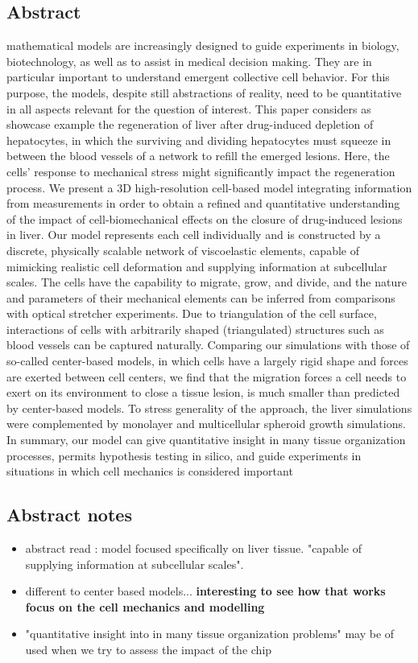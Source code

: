 \documentclass[11pt,a4paper]{article}
\begin{document}
\subsection*{Abstract}
mathematical models are increasingly designed to guide experiments in biology, biotechnology, as well as to assist in medical decision making. They are in particular important to understand emergent collective cell behavior. For this purpose, the models, despite still abstractions of reality, need to be quantitative in all aspects relevant for the question of interest. This paper considers as showcase example the regeneration of liver after drug-induced depletion of hepatocytes, in which the surviving and dividing hepatocytes must squeeze in between the blood vessels of a network to refill the emerged lesions. Here, the cells’ response to mechanical stress might significantly impact the regeneration process. We present a 3D high-resolution cell-based model integrating information from measurements in order to obtain a refined and quantitative understanding of the impact of cell-biomechanical effects on the closure of drug-induced lesions in liver. Our model represents each cell individually and is constructed by a discrete, physically scalable network of viscoelastic elements, capable of mimicking realistic cell deformation and supplying information at subcellular scales. The cells have the capability to migrate, grow, and divide, and the nature and parameters of their mechanical elements can be inferred from comparisons with optical stretcher experiments. Due to triangulation of the cell surface, interactions of cells with arbitrarily shaped (triangulated) structures such as blood vessels can be captured naturally. Comparing our simulations with those of so-called center-based models, in which cells have a largely rigid shape and forces are exerted between cell centers, we find that the migration forces a cell needs to exert on its environment to close a tissue lesion, is much smaller than predicted by center-based models. To stress generality of the approach, the liver simulations were complemented by monolayer and multicellular spheroid growth simulations. In summary, our model can give quantitative insight in many tissue organization processes, permits hypothesis testing in silico, and guide experiments in situations in which cell mechanics is considered important

\subsection*{Abstract notes}
\begin{itemize}
\item abstract read : model focused specifically on liver tissue. "capable of supplying information at subcellular scales".
\item different to center based models... \textbf{interesting to see how that works focus on the cell mechanics and modelling}
\item "quantitative insight into in many tissue organization problems" may be of used when we try to assess the impact of the chip
\end{itemize}
\end{document}
